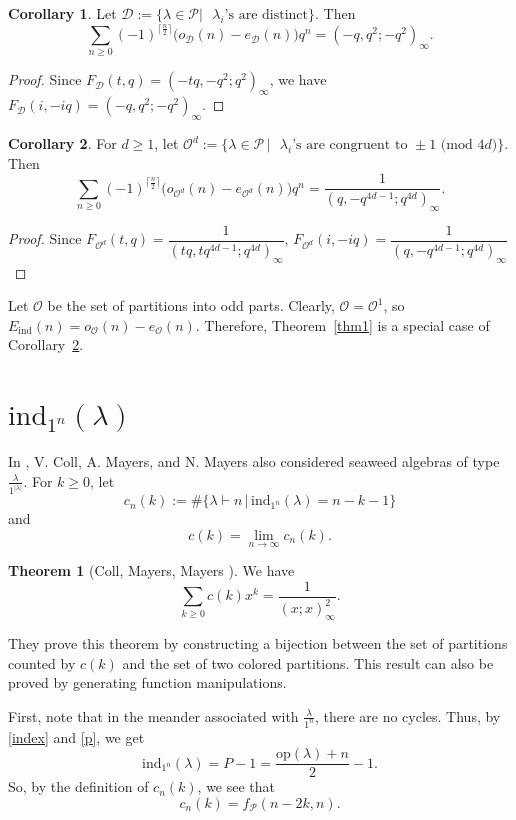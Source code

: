 \documentclass[reqno]{amsart}
\theoremstyle{definition}
\newtheorem{thm}{Theorem}%
\newtheorem{cor}{Corollary}%
\newcommand{\ind}{\mathrm{ind}}
\newcommand{\op}{\mathrm{op}}
\newcommand{\pa}{\mathcal{P}}
\newcommand{\opa}{\mathcal{O}}
\newcommand{\dis}{\mathcal{D}}
\newcommand{\lam}{\lambda}
\begin{document}
\begin{cor}
Let $\dis:=\{\lam\in \pa | \mbox{ $\lam_i$'s are distinct}\}$. Then
$$
\sum_{n\ge 0}(-1)^{ \lceil \frac{n}{2} \rceil } \big(o_{\dis}(n) -e_{\dis}(n) \big)q^n = (-q,q^2;-q^2)_\infty.
$$
\end{cor}
\begin{proof}
Since $F_{\dis}(t,q)=  (-tq,-q^2;q^2)_\infty$, we have $F_{\dis}(i,-iq)=  (-q,q^2;-q^2)_\infty$.
\end{proof}

\begin{cor} \label{cor3}
For $d\ge 1$, let $\opa^{d}:=\{\lam\in \pa \,  | \mbox{ $\lam_i$'s are congruent to $\pm$1 (mod $4d$)}\}$. Then
$$
\sum_{n\ge 0}(-1)^{ \lceil \frac{n}{2} \rceil } \big(o_{\opa^{d}}(n) -e_{\opa^{d}}(n) \big)q^n = \frac{1}{(q,-q^{4d-1};q^{4d})_\infty}.
$$
\end{cor}
\begin{proof}
Since  $F_{\opa^{d}}(t,q)=  \dfrac{1}{(tq,tq^{4d-1};q^{4d})_\infty}$,  $F_{\opa^{d}}(i,-iq)=  \dfrac{1}{(q, -q^{4d-1}; q^{4d})_\infty}$
\end{proof}

Let $\opa$ be the set of partitions into odd parts.  Clearly, $\opa=\opa^{1}$, so $E_{\ind}(n)= o_{\opa}(n) -e_{\opa}(n)$.  Therefore, Theorem~\ref{thm1} is a special case of Corollary~\ref{cor3}.

\section{ $\ind_{1^n}(\lam)$} \label{sec4}

In \cite{collmayersmayers}, V. Coll, A. Mayers, and N. Mayers also considered seaweed algebras of type $\frac{\lambda}{1^{|\lambda|}}$. For $k\ge 0$, let 
$$
c_n(k):=\# \{ \lambda\vdash n \,|\,   \ind_{1^n} (\lambda) =n-k-1\}
$$   
and
$$
c(k)=\lim_{n\to \infty} c_{n}(k).
$$
\begin{thm}[Coll, Mayers, Mayers \cite{collmayersmayers}] \label{thm3}
We have
$$
\sum_{k\ge 0} c(k) x^{k}=\frac{1}{(x;x)_{\infty}^2}.
$$
\end{thm}

They prove this theorem by constructing a bijection between the set of partitions counted by $c(k)$ and the set of two colored partitions. This result can also be proved by generating function manipulations. 

First, note that in the meander associated with $\frac{\lambda}{1^n}$, there are no cycles.  Thus, by \eqref{index} and \eqref{p}, we get
$$
\ind_{1^{n}}(\lambda)= P-1=\frac{\op(\lambda)+n}{2}-1.
$$ 
So, by the definition of $c_n(k)$, we see that
\begin{equation}
c_n(k)=f_{\pa}(n-2k,n).\label{cnk}
\end{equation}
\end{document}
